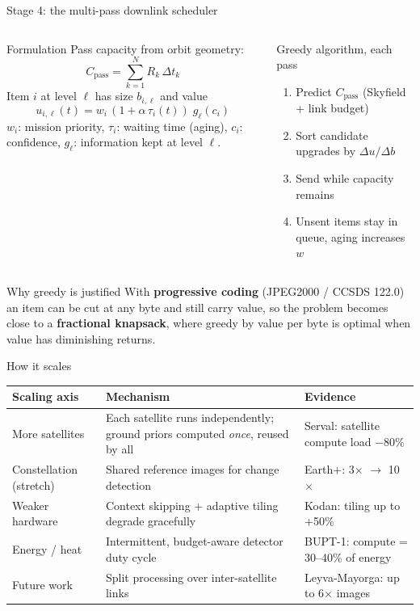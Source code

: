 \documentclass[aspectratio=169,10pt]{beamer}
\begin{document}
\begin{frame}{Stage 4: the multi-pass downlink scheduler}
\begin{columns}[T]
\begin{block}{Formulation}
\footnotesize
Pass capacity from orbit geometry:
\[ C_{\text{pass}} = \sum_{k=1}^{N} R_k\,\Delta t_k \]
Item $i$ at level $\ell$ has size $b_{i,\ell}$ and value
\[ u_{i,\ell}(t) = w_i\,(1+\alpha\,\tau_i(t))\; g_\ell(c_i) \]
\scriptsize $w_i$: mission priority, $\tau_i$: waiting time (aging), $c_i$: confidence, $g_\ell$: information kept at level $\ell$.
\end{block}
\begin{block}{Greedy algorithm, each pass}
\footnotesize
\begin{enumerate}
  \item Predict $C_{\text{pass}}$ (Skyfield + link budget)
  \item Sort candidate upgrades by $\Delta u / \Delta b$
  \item Send while capacity remains
  \item Unsent items stay in queue, aging increases $w$
\end{enumerate}
\end{block}
\end{columns}
\vspace{2mm}
\begin{exampleblock}{Why greedy is justified}
\footnotesize With \textbf{progressive coding} (JPEG2000 / CCSDS 122.0) an item can be cut at any byte and still carry value, so the problem becomes close to a \textbf{fractional knapsack}, where greedy by value per byte is optimal when value has diminishing returns.
\end{exampleblock}
\end{frame}

\begin{frame}{How it scales}
\footnotesize
\renewcommand{\arraystretch}{1.2}
\begin{tabularx}{\textwidth}{@{}l L l@{}}
\toprule
\textbf{Scaling axis} & \textbf{Mechanism} & \textbf{Evidence} \\
\midrule
More satellites & Each satellite runs independently; ground priors computed \emph{once}, reused by all & Serval: satellite compute load $-$80\% \\
Constellation (stretch) & Shared reference images for change detection & Earth+: 3$\times$ $\rightarrow$ 10$\times$ \\
Weaker hardware & Context skipping + adaptive tiling degrade gracefully & Kodan: tiling up to +50\% \\
Energy / heat & Intermittent, budget-aware detector duty cycle & BUPT-1: compute = 30--40\% of energy \\
Future work & Split processing over inter-satellite links & Leyva-Mayorga: up to 6$\times$ images \\
\bottomrule
\end{tabularx}
\end{frame}
\end{document}

